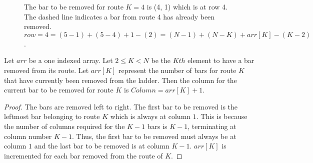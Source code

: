 \begin{figure}[!htp]
  \begin{center}
  \end{center}
  \caption{The bar to be removed for route $K=4$ is (4, 1) which is at row 4. The dashed line indicates a bar 
  from route $4$ has already been removed. $row= 4 = (5-1)+(5-4)+ 1 - (2) = (N-1)+(N-K) + arr[K] - (K-2)$.}
\end{figure}

\begin{lemma}
   Let $arr$ be a one indexed array. Let $2 \leq K < N$ be the $Kth$ element to have a bar removed from its route. 
  Let $arr[K]$ represent the number of bars for route $K$ that have currently been removed from the ladder. 
  Then the column for the current bar to be removed for route $K$ is $Column=arr[K]+1$.
\end{lemma}
\begin{proof}
  The bars are removed left to right. The first bar to be removed is the leftmost bar belonging to route $K$ which 
  is always at column $1$. This is because the number of columns required for the $K-1$ bars is $K-1$, terminating at 
  column number $K-1$. Thus, the first bar to be removed must always be at column $1$ and the last bar to 
  be removed is at column $K-1$. $arr[K]$ is incremented for each bar removed from the route of $K$.
\end{proof}

